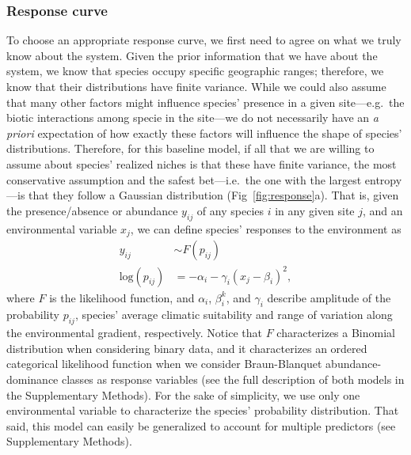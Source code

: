 \documentclass[11pt, a4paper]{article}
\begin{document}
\subsubsection*{Response curve}
To choose an appropriate response curve, we first need to agree on what we truly know about the system. Given the prior information that we have about the system, we know that species occupy specific geographic ranges; therefore, we know that their distributions have finite variance. While we could also assume that many other factors might influence species' presence in a given site---e.g.~the biotic interactions among specie in the site---we do not necessarily have an \textit{a priori} expectation of how exactly these factors will influence the shape of species' distributions. Therefore, for this baseline model, if all that we are willing to assume about species' realized niches is that these have finite variance, the most conservative assumption and the safest bet---i.e.~the one with the largest entropy---is that they follow a Gaussian distribution (Fig~\ref{fig:response}a). That is, given the presence/absence or abundance $y_{ij}$ of any species $i$ in any given site $j$, and an environmental variable $x_{j}$, we can define species' responses to the environment as
\begin{equation}
\begin{split}
y_{ij} & \sim F\left(p_{ij}\right) \\
\text{log}\left(p_{ij}\right) & = -\alpha_{i} - \gamma_{i} \left(x_{j}-\beta_{i}\right)^2 ,
\end{split}
\label{eq:baseline-response}
\end{equation}
where $F$ is the likelihood function, and $\alpha_i$, $\beta_i^k$, and $\gamma_i$ describe amplitude of the probability $p_{ij}$, species' average climatic suitability and range of variation along the environmental gradient, respectively. Notice that $F$ characterizes a Binomial distribution when considering binary data, and it characterizes an ordered categorical likelihood function when we consider Braun-Blanquet abundance-dominance classes as response variables (see the full description of both models in the Supplementary Methods). For the sake of simplicity, we use only one environmental variable to characterize the species' probability distribution. That said, this model can easily be generalized to account for multiple predictors (see Supplementary Methods).
\end{document}
